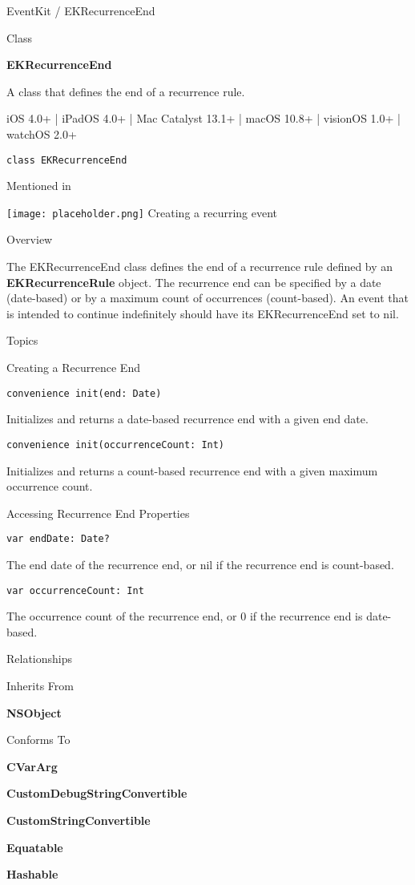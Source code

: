 \documentclass{article}
\title{}
\author{}
\date{}
\begin{document}
EventKit / EKRecurrenceEnd

Class

\textbf{EKRecurrenceEnd}

A class that defines the end of a recurrence rule.

iOS 4.0+ | iPadOS 4.0+ | Mac Catalyst 13.1+ | macOS 10.8+ | visionOS 1.0+ | watchOS 2.0+

\texttt{class EKRecurrenceEnd}

Mentioned in

\texttt{[image: placeholder.png]} Creating a recurring event

Overview

The EKRecurrenceEnd class defines the end of a recurrence rule defined by an \textbf{EKRecurrenceRule} object. The recurrence end can be specified by a date (date-based) or by a maximum count of occurrences (count-based). An event that is intended to continue indefinitely should have its EKRecurrenceEnd set to nil.

Topics

Creating a Recurrence End

\texttt{convenience init(end: Date)}

Initializes and returns a date-based recurrence end with a given end date.

\texttt{convenience init(occurrenceCount: Int)}

Initializes and returns a count-based recurrence end with a given maximum occurrence count.

Accessing Recurrence End Properties

\texttt{var endDate: Date?}

The end date of the recurrence end, or nil if the recurrence end is count-based.

\texttt{var occurrenceCount: Int}

The occurrence count of the recurrence end, or 0 if the recurrence end is date-based.

Relationships

Inherits From

\textbf{NSObject}

Conforms To

\textbf{CVarArg}

\textbf{CustomDebugStringConvertible}

\textbf{CustomStringConvertible}

\textbf{Equatable}

\textbf{Hashable}
\end{document}
